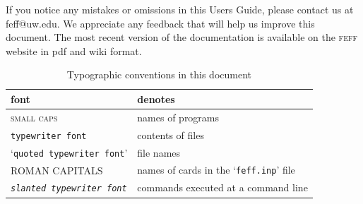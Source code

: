 \documentclass[11pt,oneside]{report} %
\renewcommand{\htmlref}[2]{\hyperlink{#2}{#1}}
\newcommand{\program}[1]{\textsc{#1}}
\newcommand{\feff}{\program{feff}}
\newcommand{\file}[1]{`\texttt{#1}'}
\renewcommand{\htmlref}[2]{{#1}} %
\begin{document}
\begin{latexonly}
If you notice any mistakes or omissions in this Users Guide, please contact us at \htmlref{feff@uw.edu}{mailto:feff@uw.edu}.  We appreciate any feedback that will help us improve this document.  The most recent version of the documentation is available on the \htmlref{{\feff} website} {http://www.feffgroup.org} in pdf and wiki format.




{}
\begin{table}[htbp]
  \caption{Typographic conventions in this document}
  \label{tab:typographic}
  \begin{center}
    \begin{tabular}[h]{ll}
      \hline\hline
      \quad font & \quad denotes \\
      \hline
      \program{small caps} & names of programs\\
      \texttt{typewriter font} &  contents of files\\
      \file{quoted typewriter font} & file names\\
      ROMAN CAPITALS & names of cards in the \file{feff.inp} file\\
      \texttt{\textsl{slanted typewriter font}} &
      commands executed at a command line \\
      \hline\hline
    \end{tabular}
  \end{center}
\end{table}
\end{latexonly} %











%
\end{document}
